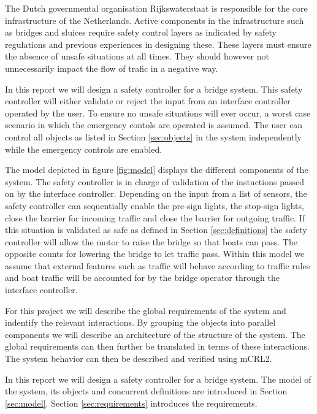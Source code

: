 %
The Dutch governmental organisation Rijkswaterstaat is responsible for the core infrastructure of the Netherlands. Active components in the infrastructure such as bridges and sluices require safety control layers as indicated by safety regulations and previous experiences in designing these. These layers must ensure the absence of unsafe situations at all times. They should however not unnecessarily impact the flow of trafic in a negative way. 

In this report we will design a safety controller for a bridge system. This safety controller will either validate or reject the input from an interface controller operated by the user. To ensure no unsafe situations will ever occur, a worst case scenario in which the emergency contols are operated is assumed. The user can  control all objects as listed in Section \ref{sec:objects} in the system independently while the emergency controls are enabled. 

The model depicted in figure \ref{fig:model} displays the different components of the system. The safety controller is in charge of validation of the instuctions passed on by the interface controller. Depending on the input from a list of sensors, the safety controller can sequentially enable the pre-sign lights, the stop-sign lights, close the barrier for incoming traffic and close the barrier for outgoing traffic. If this situation is validated as safe as defined in Section \ref{sec:definitions} the safety controller will allow the motor to raise the bridge so that boats can pass. The opposite counts for lowering the bridge to let traffic pass. Within this model we assume that external features such as traffic will behave according to traffic rules and boat traffic will be accounted for by the bridge operator through the interface controller. 

For this project we will describe the global requirements of the system and indentify the relevant interactions. By grouping the objects into parallel components we will describe an architecture of the structure of the system. The global requirements can then further be translated in terms of these interactions. The system behavior can then be described and verified using mCRL2. 

In this report we will design a safety controller for a bridge system. The model of the system, its objects and concurrent definitions are introduced in Section \ref{sec:model}. Section \ref{sec:requirements} introduces the requirements. 